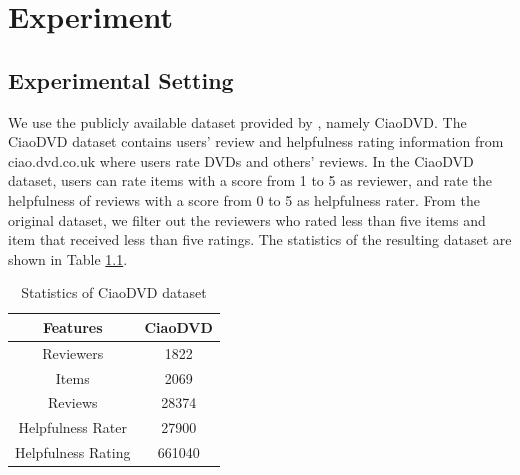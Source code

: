 \documentclass[master,english,final]{kaist-ucs}
\begin{document}

\chapter{Experiment}
\section{Experimental Setting}
We use the publicly available dataset provided by \cite{ETAF}, namely CiaoDVD.
The CiaoDVD dataset contains users’ review and helpfulness rating information from ciao.dvd.co.uk where users rate DVDs and others’ reviews.
In the CiaoDVD dataset, users can rate items with a score from 1 to 5 as reviewer, and rate the helpfulness of reviews with a score from 0 to 5 as helpfulness rater.
From the original dataset, we filter out the reviewers who rated less than five items and item that received less than five ratings.
The statistics of the resulting dataset are shown in Table \ref{tableCiaoDVD}.

\begin{table}[h]
\caption{Statistics of CiaoDVD dataset}
\label{tableCiaoDVD}
\begin{center}
\begin{tabular} {|c|c|}
\hline
\textbf{Features} & \textbf{CiaoDVD} \\ \hline
Reviewers & 1822 \\ \hline
Items & 2069 \\ \hline
Reviews & 28374 \\ \hline
Helpfulness Rater & 27900 \\ \hline
Helpfulness Rating & 661040 \\ \hline
\end{tabular}
\end{center}
\end{table}
\end{document}
